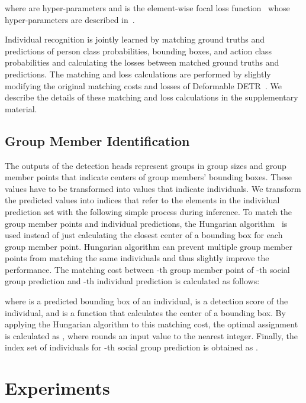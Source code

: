 \documentclass[runningheads]{llncs}
\begin{document}
where  are hyper-parameters and  is the element-wise focal loss function~\cite{lin_iccv2017} whose hyper-parameters are described in~\cite{zhou_arxiv2019}.

Individual recognition is jointly learned by matching ground truths and predictions of person class probabilities, bounding boxes, and action class probabilities and calculating the losses between matched ground truths and predictions. The matching and loss calculations are performed by slightly modifying the original matching costs and losses of Deformable DETR~\cite{zhu_iclr2021}. We describe the details of these matching and loss calculations in the supplementary material.

\subsection{Group Member Identification}\label{subsec:grid}
The outputs of the detection heads represent groups in group sizes and group member points that indicate centers of group members' bounding boxes. These values have to be transformed into values that indicate individuals. We transform the predicted values into indices that refer to the elements in the individual prediction set with the following simple process during inference.
To match the group member points and individual predictions, the Hungarian algorithm~\cite{kuhn_naval1955} is used instead of just calculating the closest center of a bounding box for each group member point. Hungarian algorithm can prevent multiple group member points from matching the same individuals and thus slightly improve the performance. The matching cost between -th group member point of -th social group prediction and -th individual prediction is calculated as follows:

where  is a predicted bounding box of an individual,  is a detection score of the individual, and  is a function that calculates the center of a bounding box. By applying the Hungarian algorithm to this matching cost, the optimal assignment is calculated as , where  rounds an input value to the nearest integer. Finally, the index set of individuals for -th social group prediction is obtained as .

\section{Experiments}
\end{document}

